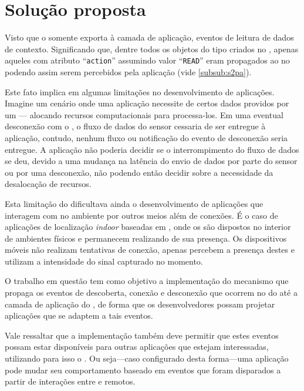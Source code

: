 \chapter{Solução proposta}\label{chap:solucao}

Visto que o \cddl somente exporta à camada de aplicação, eventos de leitura de dados de contexto.
Significando que, dentre todos os objetos do tipo \sensordata criados no \stwopa, apenas aqueles com atributo ``\texttt{action}'' assumindo valor ``\texttt{READ}'' eram propagados ao \qocevaluator no \cddl podendo assim serem percebidos pela aplicação (vide \autoref{subsub:s2pa}).

Este fato implica em algumas limitações no desenvolvimento de aplicações.
Imagine um cenário onde uma aplicação necessite de certos dados providos por um \smartobj--- alocando recursos computacionais para processa-los.
Em uma eventual desconexão com o \smartobj, o fluxo de dados do sensor cessaria de ser entregue à aplicação, contudo, nenhum fluxo ou notificação do evento de desconexão seria entregue.
A aplicação não poderia decidir se o interrompimento do fluxo de dados se deu, devido a uma mudança na latência do envio de dados por parte do sensor ou por uma desconexão, não podendo então decidir sobre a necessidade da desalocação de recursos.

Esta limitação do \cddl dificultava ainda o desenvolvimento de aplicações que interagem com \smartobjs no ambiente por outros meios além de conexões.
É o caso de aplicações de localização \textit{indoor} baseadas em \beacons \bluetooth, onde os \beacons são dispostos no interior de ambientes físicos e permanecem realizando \broadcast de sua presença.
Os dispositivos móveis não realizam tentativas de conexão, apenas percebem a presença destes \smartobjs e utilizam a intensidade do sinal capturado no momento.

O trabalho em questão tem como objetivo a implementação do mecanismo que propaga os eventos de descoberta, conexão e desconexão que ocorrem no \stwopa do \mhub até a camada de aplicação do \cddl, de forma que os desenvolvedores possam projetar aplicações que se adaptem a tais eventos.

Vale ressaltar que a implementação também deve permitir que estes eventos possam estar disponíveis para outras aplicações que estejam interessadas, utilizando para isso o \mqtt.
Ou seja---caso configurado desta forma---uma aplicação \mhubcddl pode mudar seu comportamento baseado em eventos que foram disparados a partir de interações entre \smartobjs e \smartphones remotos.

